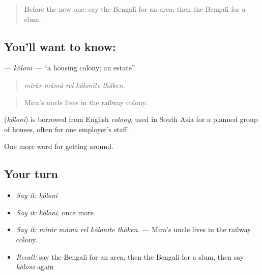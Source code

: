 \label{lesson:BN-C409-koloni}



\begin{quote}
Before the new one: say the Bengali for an area, then the Bengali for a slum.
\end{quote}

\subsection*{You'll want to know: }
\textbf{} — \emph{kôloni} — \textquotedblleft{}a housing colony; an estate\textquotedblright{}.

\begin{quote}
    
\end{quote}

\begin{quote}
\emph{mīrār māmā rel kôlonite thāken.}
\end{quote}

\begin{quote}
Mira's uncle lives in the railway colony.
\end{quote}

\begin{cousinweb}
\textbf{} (\emph{kôloni}) is borrowed from English \emph{colony}, used in South Asia for a planned group of houses, often for one employer's staff.
\end{cousinweb}

\begin{grammarlens}[title={What you've built}]
One more word for getting around.
\end{grammarlens}

\subsection*{Your turn}
\begin{itemize}
\raggedright
  \item \emph{Say it:} \emph{kôloni}
  \item \emph{Say it:} \emph{kôloni}, once more
  \item \emph{Say it:} \emph{mīrār māmā rel kôlonite thāken.} — Mira's uncle lives in the railway colony.
  \item \emph{Recall:} say the Bengali for an area, then the Bengali for a slum, then say \emph{kôloni} again
\end{itemize}


